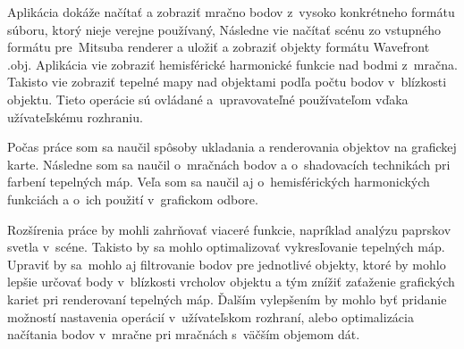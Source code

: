 Aplikácia dokáže načítať a zobraziť mračno bodov z~vysoko konkrétneho formátu súboru, ktorý nieje verejne používaný, Následne vie načítať scénu zo vstupného formátu pre~Mitsuba renderer a uložiť a zobraziť objekty formátu Wavefront .obj. Aplikácia vie zobraziť hemisférické harmonické funkcie nad bodmi z~mračna. Takisto vie zobraziť tepelné mapy nad objektami podľa počtu bodov v~blízkosti objektu. Tieto operácie sú ovládané a~upravovateľné používateľom vďaka užívateľskému rozhraniu.

Počas práce som sa naučil spôsoby ukladania a renderovania objektov na grafickej karte. Následne som sa naučil o~mračnách bodov a o~shadovacích technikách pri farbení tepelných máp. Veľa som sa naučil aj o~hemisférických harmonických funkciách a o~ich použití v~grafickom odbore.

Rozšírenia práce by mohli zahrňovať viaceré funkcie, napríklad analýzu paprskov svetla v~scéne. Takisto by sa mohlo optimalizovať vykresľovanie tepelných máp. Upraviť by sa~moh\-lo aj filtrovanie bodov pre jednotlivé objekty, ktoré by mohlo lepšie určovať body v~blízkosti vrcholov objektu a tým znížiť zaťaženie grafických kariet pri renderovaní tepelných máp. Ďalším vylepšením by mohlo byť pridanie možností nastavenia operácií v~užívateľskom rozhraní, alebo optimalizácia načítania bodov v~mračne pri mračnách s~väčším objemom dát.


%
